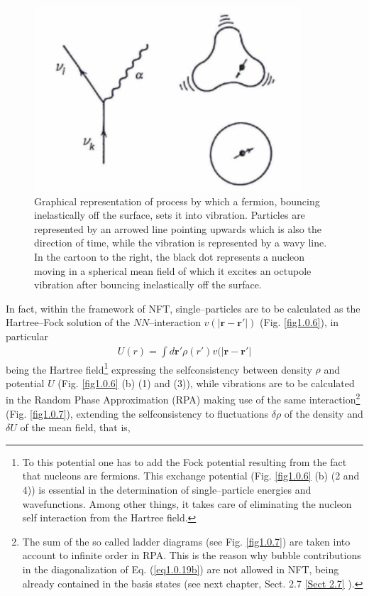 \documentclass[a4paper,11pt]{book}
\numberwithin{equation}{section}
\numberwithin{figure}{section}
\numberwithin{table}{section}
\begin{document}
  \begin{figure}
  	\centerline {
  		\includegraphics*[width=10cm]{introduccion/figs/figpreface5}
  	}
  	\caption{Graphical representation of  process       by which a fermion, bouncing inelastically off the surface, sets it into vibration. Particles are represented by an arrowed line pointing upwards which is also the direction of time, while the vibration is represented by a wavy line. In the cartoon to the right, the black dot represents a nucleon moving in a spherical mean field of which it excites an octupole vibration after bouncing inelastically off the surface.}
  	\label{fig1.0.5}
  \end{figure}
In fact, within the framework of NFT, single--particles are to be calculated as the Hartree--Fock solution of the $NN$--interaction $v(|\mathbf r-\mathbf r'|)$ (Fig. \ref{fig1.0.6}), in particular
\begin{align}\label{eq1.0.18}
U(r)=\int d\mathbf r' \rho(r')v(|\mathbf r-\mathbf r'|
\end{align}
being the Hartree field\footnote{To this potential one has to add the Fock potential resulting from the fact that nucleons are fermions. This exchange potential (Fig. \ref{fig1.0.6} (b) (2 and 4)) is essential in the determination of single--particle energies and wavefunctions. Among other things, it takes care of eliminating the nucleon self interaction from the Hartree field.} expressing the selfconsistency between density $\rho$ and potential $U$ (Fig. \ref{fig1.0.6} (b) (1) and (3)), while vibrations are to be calculated in the Random Phase Approximation (RPA) making use of the same interaction\footnote{The sum of the so called ladder diagrams (see Fig. \ref{fig1.0.7}) are taken into account to infinite order in RPA. This is the reason why bubble contributions in the diagonalization of Eq. (\ref{eq1.0.19b}) are not allowed in NFT, being already contained in the basis states (see next chapter, Sect. 2.7 \ref{Sect 2.7} ).} (Fig. \ref{fig1.0.7}), extending the selfconsistency to fluctuations $\delta\rho$ of the density and $\delta U$ of the mean field, that is,
\end{document}
